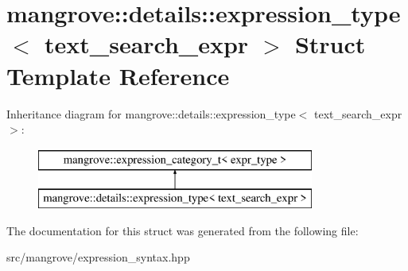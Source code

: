 \hypertarget{structmangrove_1_1details_1_1expression__type_3_01text__search__expr_01_4}{}\section{mangrove\+:\+:details\+:\+:expression\+\_\+type$<$ text\+\_\+search\+\_\+expr $>$ Struct Template Reference}
\label{structmangrove_1_1details_1_1expression__type_3_01text__search__expr_01_4}
Inheritance diagram for mangrove\+:\+:details\+:\+:expression\+\_\+type$<$ text\+\_\+search\+\_\+expr $>$\+:\begin{figure}[H]
\begin{center}
\leavevmode
\includegraphics[height=2.000000cm]{structmangrove_1_1details_1_1expression__type_3_01text__search__expr_01_4}
\end{center}
\end{figure}


The documentation for this struct was generated from the following file\+:\begin{DoxyCompactItemize}
\item 
src/mangrove/expression\+\_\+syntax.\+hpp\end{DoxyCompactItemize}
